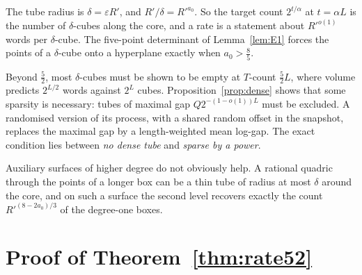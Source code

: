 \begin{remark}
The tube radius is $\delta=\varepsilon R'$, and $R'/\delta=R'^{a_0}$. So the target count $2^{t/\alpha}$ at
$t=\alpha L$ is the number of $\delta$-cubes along the core, and a rate is a statement about
$R'^{o(1)}$ words per $\delta$-cube. The five-point determinant of Lemma~\ref{lem:E1} forces the points of a
$\delta$-cube onto a hyperplane exactly when $a_0>\tfrac85$.

Beyond $\tfrac52$, most $\delta$-cubes must be shown to be empty at $T$-count $\tfrac52L$, where volume
predicts $2^{L/2}$ words against $2^L$ cubes. Proposition~\ref{prop:dense} shows that some sparsity is necessary: tubes of
maximal gap $Q2^{-(1-o(1))L}$ must be excluded. A randomised version of its process, with a shared random offset in the
snapshot, replaces the maximal gap by a length-weighted mean log-gap. The exact condition lies between
\emph{no dense tube} and \emph{sparse by a power}.

Auxiliary surfaces of higher degree do not obviously help. A rational quadric through the points of a
longer box can be a thin tube of radius at most $\delta$ around the core, and on such a surface the
second level recovers exactly the count $R'^{(8-2a_0)/3}$ of the degree-one boxes.
\end{remark}

\section{Proof of Theorem~\ref{thm:rate52}}\label{app:rate52}

